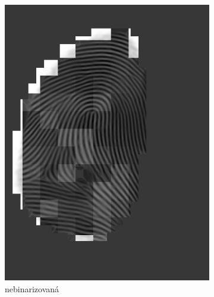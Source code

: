   \begin{figure}[h]
    \centering
    \begin{subfigure}[b]{0.3\linewidth}
      \includegraphics[width=\linewidth]{obrazky-figures/gabor_filtered.png}
      \caption{nebinarizovaná}
    \end{subfigure}
    \hfill
    \begin{subfigure}[b]{0.3\linewidth}

\end{subfigure}
\end{figure}
